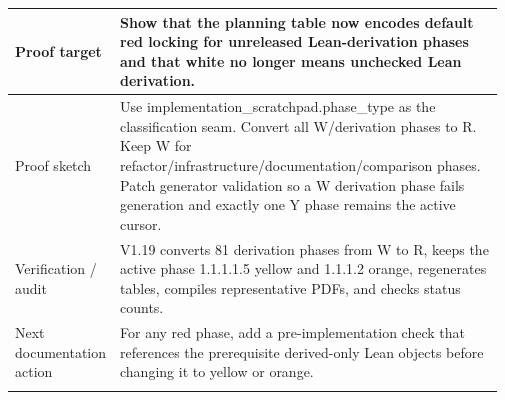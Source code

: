 \begin{longtable}{L{0.16\linewidth} L{0.81\linewidth}}
\hline\addlinespace[0.20em]
Proof target & Show that the planning table now encodes default red locking for unreleased Lean-derivation phases and that white no longer means unchecked Lean derivation.\\
\hline\addlinespace[0.20em]
Proof sketch & Use implementation\_scratchpad.phase\_type as the classification seam. Convert all W/\allowbreak{}derivation phases to R. Keep W for refactor/\allowbreak{}infrastructure/\allowbreak{}documentation/\allowbreak{}comparison phases. Patch generator validation so a W derivation phase fails generation and exactly one Y phase remains the active cursor.\\
\hline\addlinespace[0.20em]
Verification /\allowbreak{} audit & V1.19 converts 81 derivation phases from W to R, keeps the active phase 1.1.1.1.5 yellow and 1.1.1.2 orange, regenerates tables, compiles representative PDFs, and checks status counts.\\
\hline\addlinespace[0.20em]
Next documentation action & For any red phase, add a pre-implementation check that references the prerequisite derived-only Lean objects before changing it to yellow or orange.\\
\hline\addlinespace[0.20em]
\end{longtable}
